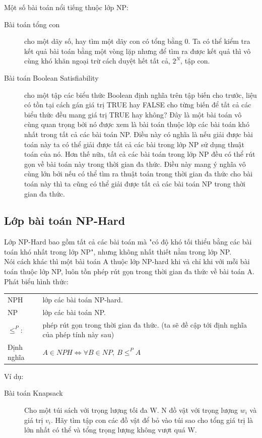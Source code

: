 \documentclass[a4paper 14pt]{extarticle}
\begin{document}
			Một số bài toán nổi tiếng thuộc lớp NP:\\ 
			\begin{description}
				\item[Bài toán tổng con] cho một dãy số, hay tìm một dãy con có tổng bằng 0. Ta có thể kiểm tra kết quả bài toán bằng một vòng lặp nhưng để tìm ra được kết quả thì vô cùng khó khăn ngoại trừ cách duyệt hết tất cả, $2^N$, tập con.
				\item[Bài toán Boolean Satisfiability] \label{EX: NP-C} cho một tập các biểu thức Boolean định nghĩa trên tập biến cho trước, liệu có tồn tại cách gán giá trị TRUE hay FALSE cho từng biến để tất cả các biểu thức đều mang giá trị TRUE hay không? Đây là một bài toán vô cùng quan trọng bởi nó được xem là bài toán thuộc lớp các bài toán khó nhất trong tất cả các bài toán NP. Điều này có nghĩa là nếu giải được bài toán này ta có thể giải được tất cả các bài trong lớp NP sử dụng thuật toán của nó. Hơn thế nữa, tất cả các bài toán trong lớp NP đều có thể rút gọn về bài toán này trong thời gian đa thức. Điều này mang ý nghĩa vô cùng lớn bởi nếu có thể tìm ra thuật toán trong thời gian đa thức cho bài toán này thì ta cũng có thể giải được tất cả các bài toán NP trong thời gian đa thức.
			\end{description}
		\subsection{Lớp bài toán NP-Hard}
			Lớp NP-Hard bao gồm tất cả các bài toán mà "có độ khó tối thiểu bằng các bài toán khó nhất trong lớp NP", nhưng không nhất thiết nằm trong lớp NP.\\
			Nói cách khác thì một bài toán A thuộc lớp NP-hard khi và chỉ khi với mỗi bài toán thuộc lớp NP, luôn tồn phép rút gọn trong thời gian đa thức về bài toán A.\\
			Phát biểu hình thức:
			\begin{addmargin}{0.5in}
				\begin{tabular}{l p{4in}}
				NPH& lớp các bài toán NP-hard.\\
				NP& lớp các bài toán NP.\\
				$\leq^{P}:$& phép rút gọn trong thời gian đa thức. (ta sẽ đề cập tới định nghĩa của phép tính này sau)\\
				Định nghĩa&$A \in NPH \Leftrightarrow \forall B \in NP,~ B \leq^{P} A$
				\end{tabular}
			\end{addmargin}
			Ví dụ:
			\begin{description}
				\item[Bài toán Knapsack]  Cho một túi sách với trọng lượng tối đa W. N đồ vật với trọng lượng $w_{i}$ và giá trị $v_{i}$. Hãy tìm tập con các đồ vật để bỏ vào túi sao cho tổng giá trị là lớn nhất có thể và tổng trọng lượng không vượt quá W.
			\end{description}
\end{document}
